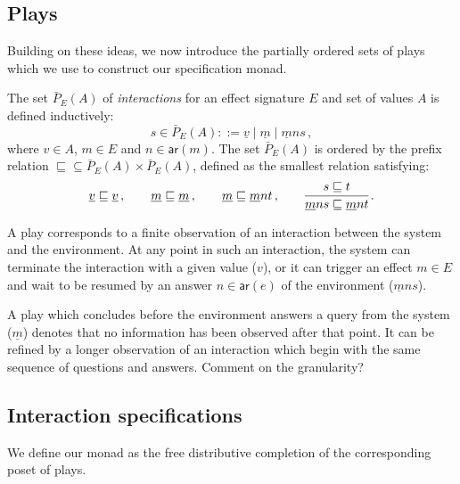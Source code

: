 \documentclass[sigplan,10pt,review,anonymous]{acmart}
\newcommand{\kw}[1]{\ensuremath{ \mathsf{#1} }}
\begin{document}

\subsection{Plays} \label{sec:intm:plays} %

Building on these ideas,
we now introduce the partially ordered sets of plays
which we use to construct our specification monad.

\begin{definition}
The set $\bar{P}_E(A)$ of \emph{interactions}
for an effect signature $E$ and set of values $A$
is defined inductively:
\[
  s \in \bar{P}_E(A) ::=
    \underline{v} \mid
    \underline{m} \mid
    \underline{m} n s \,,
\]
where $v \in A$, $m \in E$ and $n \in \kw{ar}(m)$.
The set $\bar{P}_E(A)$ is ordered by the prefix relation
${\sqsubseteq} \subseteq \bar{P}_E(A) \times \bar{P}_E(A)$,
defined
as the smallest relation satisfying:
\[
  \underline{v} \sqsubseteq \underline{v} \,, \qquad
  \underline{m} \sqsubseteq \underline{m} \,, \qquad
  \underline{m} \sqsubseteq \underline{m} n t \,, \qquad
  \begin{prooftree}
    \hypo{s \sqsubseteq t}
    \infer1{\underline{m} n s \sqsubseteq \underline{m} n t}
  \end{prooftree} \,.
\]
\end{definition}

A play corresponds to a finite observation of
an interaction between the system and the environment.
At any point in such an interaction,
the system can terminate the interaction with a given value ($v$),
or it can trigger an effect $m \in E$ and
wait to be resumed by
an answer $n \in \kw{ar}(e)$ of the environment
($\underline{m} n s$).

A play which concludes before
the environment answers a query from the system ($\underline{m}$)
denotes that no information has been observed after that point.
It can be refined by a longer observation
of an interaction which begin with the same sequence of
questions and answers.
{\color{gray} Comment on the granularity?}


\subsection{Interaction specifications} %

We define our monad as the free distributive completion
of the corresponding poset of plays.
\end{document}
